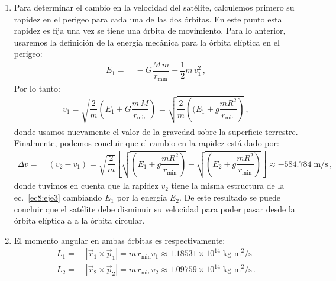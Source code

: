 \begin{enumerate}
\begin{enumerate}
\item Para determinar el cambio en la velocidad del satélite, calculemos primero su rapidez en el perigeo para cada una de las dos órbitas. En este punto esta rapidez es fija una vez se tiene una órbita de movimiento.
Para lo anterior, usaremos la definición de la energía mecánica para la órbita elíptica en el perigeo:
%
\begin{align}
\label{ec7:eje3}
E_1=&\;-G\dfrac{M\,m}{r_{\text{min}}}+\dfrac{1}{2}m\, v_1^2\,,
\end{align}
%
Por lo tanto:
%
\begin{align}
\label{ec8:eje3}
v_1=\sqrt{\dfrac{2}{m}\left(E_1+G\dfrac{m\,M}{r_{\text{min}}}\right)}
=\sqrt{\dfrac{2}{m}\left((E_1+g\dfrac{mR^2}{r_{\text{min}}}\right)}\,,
\end{align}
donde usamos nuevamente el valor de la gravedad sobre la superficie terrestre.
%
Finalmente, podemos concluir que el cambio en la rapidez está dado por:
\begin{align}
\label{ec9:eje3}
\Delta v =&\; (v_2-v_1)=\sqrt{\dfrac{2}{m}}\left[\sqrt{\left(E_1+g\dfrac{mR^2}{r_{\text{min}}}\right)}-\sqrt{\left(E_2+g\dfrac{mR^2}{r_{\text{min}}}\right)}\right]\approx -584.784\; \text{m/s} \,,
\end{align}
%
donde tuvimos en cuenta que la rapidez $v_2$ tiene la misma estructura de la ec.~\eqref{ec8:eje3} cambiando $E_1$ por la energía $E_2$. De este resultado se puede concluir que el satélite debe disminuir su velocidad para poder pasar desde la órbita elíptica a a la órbita circular.

\item El momento angular en ambas órbitas es respectivamente:
\begin{align}
L_1=&\; |\vec{r}_1\times \vec{p}_1|= m\, r_{\text{min}}v_1 \approx 1.18531\times10^{14}\; \text{kg m}^2/\text{s}\\
L_2=&\;|\vec{r}_2\times \vec{p}_2|= m\, r_{\text{min}}v_2 \approx 1.09759\times10^{14} \; \text{kg m}^2/\text{s}\,.
\end{align}


\end{enumerate}


















\end{enumerate}






